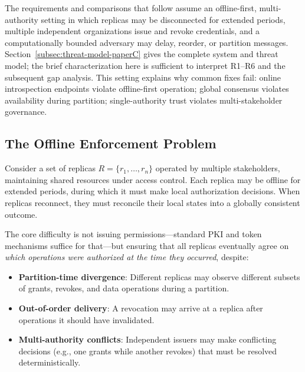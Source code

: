 \documentclass[10pt,journal,compsoc]{IEEEtran}
\begin{document}
The requirements and comparisons that follow assume an offline-first, multi-authority setting in which replicas may be disconnected for extended periods, multiple independent organizations issue and revoke credentials, and a computationally bounded adversary may delay, reorder, or partition messages. Section~\ref{subsec:threat-model-paperC} gives the complete system and threat model; the brief characterization here is sufficient to interpret R1--R6 and the subsequent gap analysis. This setting explains why common fixes fail: online introspection endpoints violate offline-first operation; global consensus violates availability during partition; single-authority trust violates multi-stakeholder governance.

\subsection{The Offline Enforcement Problem}

Consider a set of replicas $R = \{r_1, \ldots, r_n\}$ operated by multiple stakeholders, maintaining shared resources under access control. Each replica may be offline for extended periods, during which it must make local authorization decisions. When replicas reconnect, they must reconcile their local states into a globally consistent outcome.

The core difficulty is not issuing permissions---standard PKI and token mechanisms suffice for that---but ensuring that all replicas eventually agree on \emph{which operations were authorized at the time they occurred}, despite:
\begin{itemize}
    \item \textbf{Partition-time divergence}: Different replicas may observe different subsets of grants, revokes, and data operations during a partition.
    \item \textbf{Out-of-order delivery}: A revocation may arrive at a replica after operations it should have invalidated.
    \item \textbf{Multi-authority conflicts}: Independent issuers may make conflicting decisions (e.g., one grants while another revokes) that must be resolved deterministically.
\end{itemize}
\end{document}

